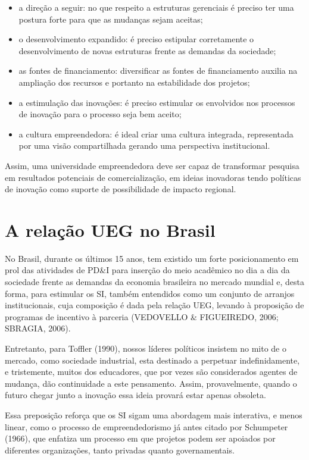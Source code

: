 \begin{itemize}
  \item{a direção a seguir: no que respeito a estruturas gerenciais é preciso ter uma postura forte para que as mudanças sejam aceitas;}
  \item{o desenvolvimento expandido: é preciso estipular corretamente o desenvolvimento de novas estruturas frente as demandas da sociedade;}
  \item{as fontes de financiamento: diversificar as fontes de financiamento auxilia na ampliação dos recursos e portanto na estabilidade dos projetos;}
  \item{a estimulação das inovações: é preciso estimular os envolvidos nos processos de inovação para o processo seja bem aceito;}
  \item{a cultura empreendedora: é ideal criar uma cultura integrada, representada por uma visão compartilhada gerando uma perspectiva institucional.}
\end{itemize}

Assim, uma universidade empreendedora deve ser capaz de transformar pesquisa em resultados potenciais de comercialização, em ideias inovadoras tendo políticas de inovação como suporte de possibilidade de impacto regional.


\section{A relação UEG no Brasil}

No Brasil, durante os últimos 15 anos, tem existido um forte posicionamento em prol das atividades de PD\&I para inserção do meio acadêmico no dia a dia da sociedade frente as demandas da economia brasileira no mercado mundial e, desta forma, para estimular os SI, também entendidos como um conjunto de arranjos institucionais, cuja composição é dada pela relação UEG, levando à proposição de programas de incentivo à parceria (VEDOVELLO \& FIGUEIREDO, 2006; SBRAGIA, 2006).

Entretanto, para Toffler (1990), nossos líderes políticos insistem no mito de o mercado, como sociedade industrial, esta destinado a perpetuar indefinidamente, e tristemente, muitos dos educadores, que por vezes são considerados agentes de mudança, dão continuidade a este pensamento. Assim, provavelmente, quando o futuro chegar junto a inovação essa ideia provará estar apenas obsoleta.

Essa preposição reforça que os SI sigam uma abordagem mais interativa, e menos linear, como o processo de empreendedorismo já antes citado por Schumpeter (1966), que enfatiza um processo em que projetos podem ser apoiados por diferentes organizações, tanto privadas quanto governamentais.

